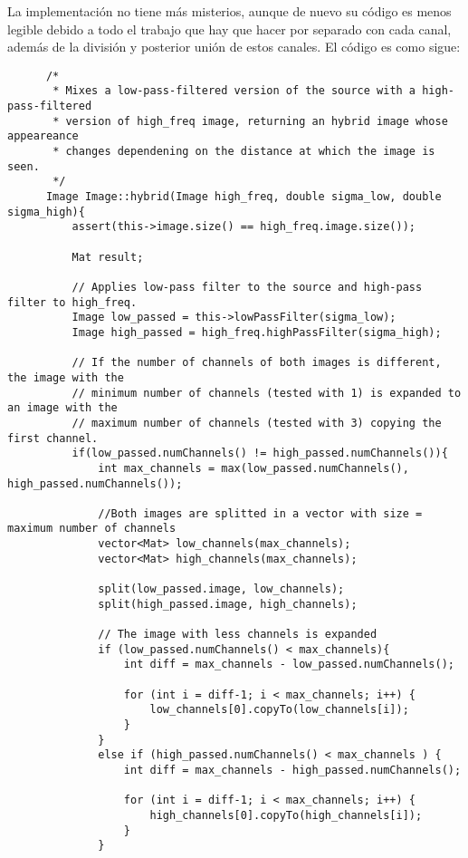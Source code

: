 \documentclass[a4paper, 11pt]{article}
\theoremstyle{definition}
\theoremstyle{theorem}
\begin{document}
  La implementación no tiene más misterios, aunque de nuevo su código es menos legible debido a todo el trabajo que hay que hacer por separado con cada canal, además de la división y posterior unión de estos canales. El código es como sigue:
  \begin{lstlisting}
      /*
       * Mixes a low-pass-filtered version of the source with a high-pass-filtered
       * version of high_freq image, returning an hybrid image whose appeareance
       * changes dependening on the distance at which the image is seen.
       */
      Image Image::hybrid(Image high_freq, double sigma_low, double sigma_high){
          assert(this->image.size() == high_freq.image.size());

          Mat result;

          // Applies low-pass filter to the source and high-pass filter to high_freq.
          Image low_passed = this->lowPassFilter(sigma_low);
          Image high_passed = high_freq.highPassFilter(sigma_high);

          // If the number of channels of both images is different, the image with the
          // minimum number of channels (tested with 1) is expanded to an image with the
          // maximum number of channels (tested with 3) copying the first channel.
          if(low_passed.numChannels() != high_passed.numChannels()){
              int max_channels = max(low_passed.numChannels(), high_passed.numChannels());

              //Both images are splitted in a vector with size = maximum number of channels
              vector<Mat> low_channels(max_channels);
              vector<Mat> high_channels(max_channels);

              split(low_passed.image, low_channels);
              split(high_passed.image, high_channels);

              // The image with less channels is expanded
              if (low_passed.numChannels() < max_channels){
                  int diff = max_channels - low_passed.numChannels();

                  for (int i = diff-1; i < max_channels; i++) {
                      low_channels[0].copyTo(low_channels[i]);
                  }
              }
              else if (high_passed.numChannels() < max_channels ) {
                  int diff = max_channels - high_passed.numChannels();

                  for (int i = diff-1; i < max_channels; i++) {
                      high_channels[0].copyTo(high_channels[i]);
                  }
              }


\end{lstlisting}
\end{document}
